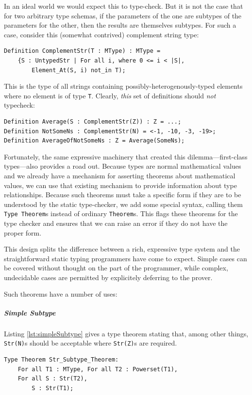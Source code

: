 In an ideal world we would expect this to type-check.  But it is not the case that for two arbitrary type schemas, if the parameters of the one are subtypes of the parameters for the other, then the results are themselves subtypes.  For such a case, consider this (somewhat contrived) complement string type:

\begin{lstlisting}
Definition ComplementStr(T : MType) : MType = 
	{S : UntypedStr | For all i, where 0 <= i < |S|,
		Element_At(S, i) not_in T);
\end{lstlisting}

This is the type of all strings containing possibly-heterogenously-typed elements where no element is of type \texttt{T}.  Clearly, \emph{this} set of definitions should \emph{not} typecheck:

\begin{lstlisting}
Definition Average(S : ComplementStr(Z)) : Z = ...;
Definition NotSomeNs : ComplementStr(N) = <-1, -10, -3, -19>;
Definition AverageOfNotSomeNs : Z = Average(SomeNs);
\end{lstlisting}

Fortunately, the same expressive machinery that created this dilemma---first-class types---also provides a road out.  Because types are normal mathematical values and we already have a mechanism for asserting theorems about mathematical values, we can use that existing mechanism to provide information about type relationships.  Because such theorems must take a specific form if they are to be understood by the static type-checker, we add some special syntax, calling them \texttt{Type Theorem}s instead of ordinary \texttt{Theorem}s.  This flags these theorems for the type checker and ensures that we can raise an error if they do not have the proper form.

This design splits the difference between a rich, expressive type system and the straightforward static typing programmers have come to expect.  Simple cases can be covered without thought on the part of the programmer, while complex, undecidable cases are permitted by explicitely deferring to the prover.

Such theorems have a number of uses:

\subparagraph{Simple Subtype}
Listing \ref{lst:simpleSubtype} gives a type theorem stating that, among other things, \texttt{Str(N)}s should be acceptable where \texttt{Str(Z)}s are required.

\begin{lstlisting}[float=h,language=resolve,caption={Subtype relationship among strings\label{lst:simpleSubtype}}]
Type Theorem Str_Subtype_Theorem:
	For all T1 : MType, For all T2 : Powerset(T1),
	For all S : Str(T2),
		S : Str(T1);
\end{lstlisting}

